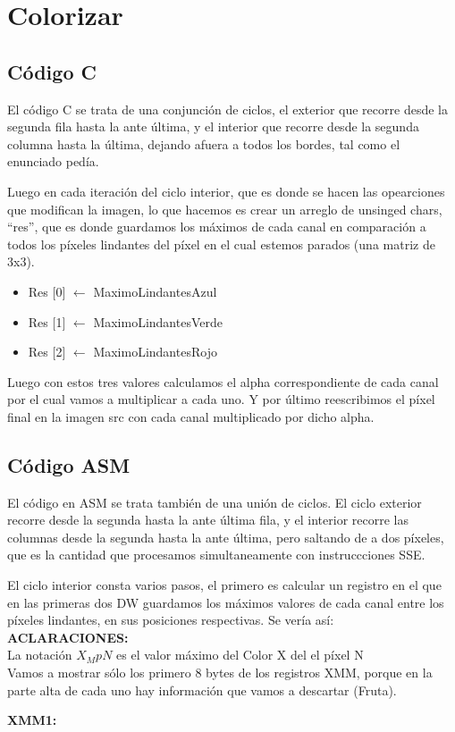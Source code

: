 \section{Colorizar}

\subsection{Código C}
\par{El código C se trata de una conjunción de ciclos, el exterior que recorre desde la segunda fila hasta la ante última, y el interior que recorre desde la segunda columna hasta la última, dejando afuera a todos los bordes, tal como el enunciado pedía.}
\par{Luego en cada iteración del ciclo interior, que es donde se hacen las opearciones que modifican la imagen, lo que hacemos es crear un arreglo de unsinged chars, ``res'', que es  donde guardamos los máximos de cada canal en comparación a todos  los píxeles lindantes del píxel en el cual estemos parados (una matriz de 3x3).}
\begin{itemize}
\item {Res $[$0$]$ $\leftarrow$ MaximoLindantesAzul}
\item {Res $[$1$]$ $\leftarrow$ MaximoLindantesVerde}
\item {Res $[$2$]$ $\leftarrow$ MaximoLindantesRojo}
\end{itemize}
\par{Luego con estos tres valores calculamos el alpha correspondiente de cada canal por el cual vamos a multiplicar a cada uno. Y por último reescribimos el píxel final en la imagen src con cada canal multiplicado por dicho alpha.}

\subsection{Código ASM}
\par{El código en ASM se trata también de una unión de ciclos. El ciclo exterior recorre desde la segunda hasta la ante última fila, y el interior recorre las columnas desde la segunda hasta la ante última, pero saltando de a dos píxeles, que es la cantidad que procesamos simultaneamente con instruccciones SSE.}
\par{El ciclo interior consta varios pasos, el primero es calcular un registro en el que en las primeras dos DW guardamos los máximos valores de cada canal entre los píxeles lindantes, en sus posiciones respectivas. Se vería así:}
\\\textbf{ACLARACIONES:} 
\\ \hspace{3cm} La notación $X_M{pN}$ es el valor máximo del Color X del el píxel N
\\ \hspace{3cm} Vamos a mostrar sólo los primero 8 bytes de los registros XMM, porque en la parte alta de cada uno hay información que vamos a descartar (Fruta).
\\
\par{\textbf{XMM1:}}
	
